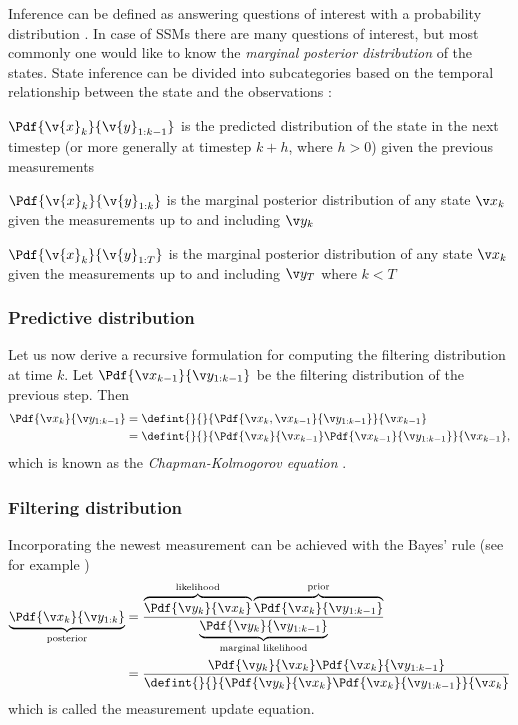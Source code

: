 Inference can be defined as answering questions of interest with a probability distribution \parencite{barber2011bayesian}.
In case of SSMs there are many questions of interest, but most commonly one would
like to know the \emph{marginal posterior distribution} of the states. State inference
can be divided into subcategories based on the temporal relationship between the state
and the observations \parencite{Sarkka2006}:
\begin{description}
\addtolength{\leftskip}{1cm}
	\item[Predictive distribution]
	$\Pdf{\v{x}_{k}}{\v{y}_{1:k-1}}$ is the predicted distribution of the state in the next timestep (or more generally at timestep $k+h$, where $h>0$) 
	given the previous measurements
	\item[Filtering distribution] $\Pdf{\v{x}_k}{\v{y}_{1:k}}$ is the marginal posterior distribution
	of any state $\xk$ given the measurements up to and including $\yk$
	\item[Smoothing distribution]
	$\Pdf{\v{x}_k}{\v{y}_{1:T}}$ is the marginal posterior distribution
	of any state $\xk$ given the measurements up to and including $\y_T$ where $k<T$
\end{description} 

\subsubsection*{Predictive distribution}
Let us now derive a recursive formulation for computing the filtering distribution at time $k$. Let $\Pdf{\xkk}{\y_{1:k-1}}$
be the filtering distribution of the previous step. Then 
\begin{align}
	\Pdf{\xk}{\y_{1:k-1}}&=\defint{}{}{\Pdf{\xk,\xkk}{\y_{1:k-1}}}{\xkk} \nonumber\\
	&=\defint{}{}{\Pdf{\xk}{\xkk}\Pdf{\xkk}{\y_{1:k-1}}}{\xkk},
	\label{eq:pred_bayes}
\end{align}
which is known as the \emph{Chapman-Kolmogorov equation} \parencite{Sarkka2006}.
\subsubsection*{Filtering distribution}
Incorporating the newest measurement can be achieved with the Bayes'
rule (see for example \cite{gelman2004})
\begin{align}
	\underbrace{\Pdf{\xk}{\y_{1:k}}}_\text{posterior}&=\frac{\overbrace{\Pdf{\yk}{\xk}}^\text{likelihood}\overbrace{\Pdf{\xk}{\y_{1:k-1}}}^\text{prior}}{\underbrace{\Pdf{\y_{k}}{\y_{1:k-1}}}_\text{marginal likelihood}}\nonumber\\
	&=\frac{\Pdf{\yk}{\xk}\Pdf{\xk}{\y_{1:k-1}}}{\defint{}{}{\Pdf{\yk}{\xk}\Pdf{\xk}{\y_{1:k-1}}}{\xk}}
\end{align}
which is called the measurement update equation.

